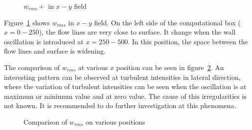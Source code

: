 \begin{figure}[!h]
  \centering
  \caption{$w_{rms}+$ in $x-y$ field}
  \label{fig:wrms+_xy}
\end{figure}

Figure~\ref{fig:wrms+_xy} shows $w_{rms}$ in $x-y$ field. On the left side of the computational box ($x=0-250$), the flow lines are very close to surface. It change when the wall oscillation is introduced at $x=250-500$. In this position, the space between the flow lines and surface is widening.

The comparison of $w_{rms}$ at various $x$ position can be seen in figure~\ref{fig:wrms_comparison}. An interesting pattern can be observed at turbulent intensities in lateral direction, where the variation of turbulent intensities can be seen when the oscillation is at maximum or minimum value and at zero value. The cause of this irregularities is not known. It is recommended to do further investigation at this phenomena. 

\begin{figure}[h]
  \centering
  \caption{Comparison of $w_{rms}$ on various positions}
  \label{fig:wrms_comparison}
\end{figure}
